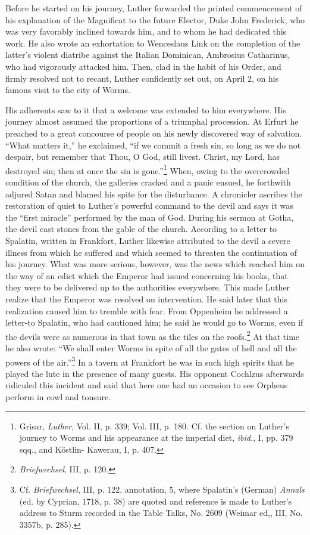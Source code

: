 Before he started on his journey, Luther forwarded the printed
commencement of his explanation of the Magnificat to the future
Elector, Duke John Frederick, who was very favorably inclined
towards him, and to whom
he had dedicated this work. He also wrote
an exhortation to Wenceslaus Link on the completion of the latter’s
violent diatribe against the Italian Dominican, Ambrosius Catharinus,
who had vigorously attacked him. Then, clad in the habit of his Order,
and firmly resolved not to recant, Luther confidently set out,
on April 2, on his famous visit to the city of Worms.

His adherents saw to it that a welcome was extended to him everywhere.
His journey almost assumed the proportions of a triumphal
procession. At Erfurt he preached to a great concourse of people on
his newly discovered way of salvation. “What matters it,” he exclaimed,
“if we commit a fresh sin, so long as we do not despair, but
remember that Thou, O God, still livest. Christ, my Lord, has destroyed
sin; then at once the sin is gone.”\footnote
{Grisar, \textit{Luther}, Vol. II, p. 339; Vol. III, p. 180. Cf. the section on Luther’s journey
to Worms and his appearance at the imperial diet, \textit{ibid.}, I, pp. 379 sqq., and Köstlin-
Kawerau, I, p. 407.}
When, owing to the overcrowded condition
of the church, the galleries cracked and a panic
ensued, he forthwith adjured Satan and blamed his spite for the disturbance.
A chronicler ascribes the restoration of quiet to Luther’s
powerful command to the devil and says it was the “first miracle”
performed by the man of God. During his sermon at Gotha, the
devil cast stones from the gable of the church. According to a letter
to Spalatin, written in Frankfort, Luther likewise attributed to the
devil a severe illness from which he suffered and which seemed to
threaten the continuation of his journey. What was more serious,
however, was the news which reached him on the way of an edict
which the Emperor had issued concerning his books, that they were to
be delivered up to the authorities everywhere. This made Luther realize
that the Emperor was resolved on intervention. He said later that
this realization caused him to tremble with fear. From Oppenheim
he addressed a letter-to Spalatin, who had cautioned him; he said he
would go to Worms, even if the devils were as numerous in that town
as the tiles on the roofs.\footnote{\textit{Briefwechsel}, III, p. 120.}
At that time he also wrote: “We shall enter
Worms in spite of all the gates of hell and all the powers of the
air.”\footnote
{Cf. \textit{Briefwechsel}, III, p. 122, annotation, 5, where Spalatin’s (German) \textit{Annals} (ed. by
Cyprian, 1718, p. 38) are quoted and reference is made to Luther’s address to Sturm recorded
in the Table Talks, No. 2609 (Weimar ed,, III, No. 3357b, p. 285).}
In a tavern at Frankfort he was in such high spirits that he
played the lute in the presence of many guests. His opponent Cochlzus afterwards
ridiculed this incident and said that here one had an
occasion to see Orpheus perform in cowl and tonsure.


